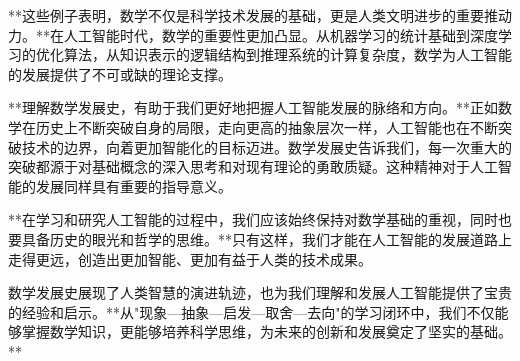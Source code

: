 **这些例子表明，数学不仅是科学技术发展的基础，更是人类文明进步的重要推动力。**在人工智能时代，数学的重要性更加凸显。从机器学习的统计基础到深度学习的优化算法，从知识表示的逻辑结构到推理系统的计算复杂度，数学为人工智能的发展提供了不可或缺的理论支撑。

**理解数学发展史，有助于我们更好地把握人工智能发展的脉络和方向。**正如数学在历史上不断突破自身的局限，走向更高的抽象层次一样，人工智能也在不断突破技术的边界，向着更加智能化的目标迈进。数学发展史告诉我们，每一次重大的突破都源于对基础概念的深入思考和对现有理论的勇敢质疑。这种精神对于人工智能的发展同样具有重要的指导意义。

**在学习和研究人工智能的过程中，我们应该始终保持对数学基础的重视，同时也要具备历史的眼光和哲学的思维。**只有这样，我们才能在人工智能的发展道路上走得更远，创造出更加智能、更加有益于人类的技术成果。

数学发展史展现了人类智慧的演进轨迹，也为我们理解和发展人工智能提供了宝贵的经验和启示。**从"现象—抽象—启发—取舍—去向"的学习闭环中，我们不仅能够掌握数学知识，更能够培养科学思维，为未来的创新和发展奠定了坚实的基础。**
